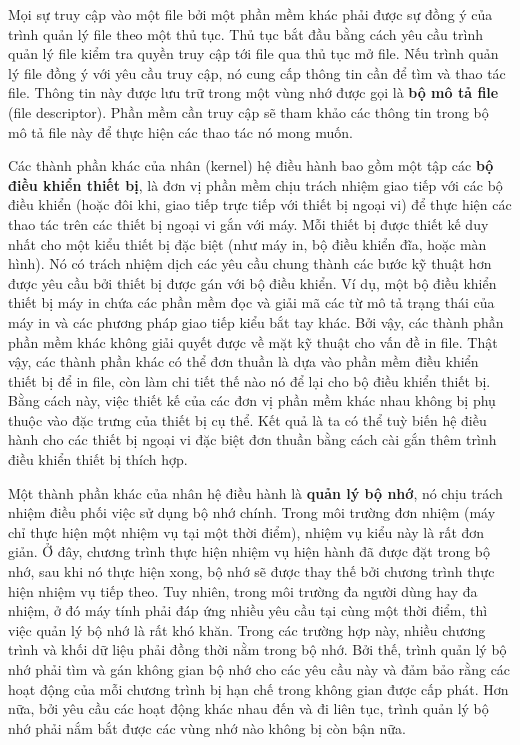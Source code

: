 Mọi sự truy cập vào một file bởi một phần mềm khác phải được sự đồng ý của trình quản lý
file theo một thủ tục. Thủ tục bắt đầu bằng cách yêu cầu trình quản lý file kiểm tra quyền
truy cập tới file qua thủ tục mở file. Nếu trình quản lý file đồng ý với yêu cầu truy cập,
nó cung cấp thông tin cần để tìm và thao tác file. Thông tin này được lưu trữ trong một
vùng nhớ được gọi là \textbf{bộ mô tả file} (file descriptor). Phần mềm cần truy cập sẽ
tham khảo các thông tin trong bộ mô tả file này để thực hiện các thao tác nó mong muốn.

Các thành phần khác của nhân (kernel) hệ điều hành bao gồm một tập các \textbf{bộ điều
  khiển thiết bị}, là đơn vị phần mềm chịu trách nhiệm giao tiếp với các bộ điều khiển
(hoặc đôi khi, giao tiếp trực tiếp với thiết bị ngoại vi) để thực hiện các thao tác trên
các thiết bị ngoại vi gắn với máy. Mỗi thiết bị được thiết kế duy nhất cho một kiểu thiết
bị đặc biệt (như máy in, bộ điều khiển đĩa, hoặc màn hình). Nó có trách nhiệm dịch các yêu
cầu chung thành các bước kỹ thuật hơn được yêu cầu bởi thiết bị được gán với bộ điều
khiển. Ví dụ, một bộ điều khiển thiết bị máy in chứa các phần mềm đọc và giải mã các từ mô
tả trạng thái của máy in và các phương pháp giao tiếp kiểu bắt tay khác. Bởi vậy, các
thành phần phần mềm khác không giải quyết được về mặt kỹ thuật cho vấn đề in file. Thật
vậy, các thành phần khác có thể đơn thuần là dựa vào phần mềm điều khiển thiết bị để in
file, còn làm chi tiết thế nào nó để lại cho bộ điều khiển thiết bị. Bằng cách này, việc
thiết kế của các đơn vị phần mềm khác nhau không bị phụ thuộc vào đặc trưng của thiết bị
cụ thể. Kết quả là ta có thể tuỳ biến hệ điều hành cho các thiết bị ngoại vi đặc biệt đơn
thuần bằng cách cài gắn thêm trình điều khiển thiết bị thích hợp.

Một thành phần khác của nhân hệ điều hành là \textbf{quản lý bộ nhớ}, nó chịu trách nhiệm
điều phối việc sử dụng bộ nhớ chính. Trong môi trường đơn nhiệm (máy chỉ thực hiện một
nhiệm vụ tại một thời điểm), nhiệm vụ kiểu này là rất đơn giản. Ở đây, chương trình thực
hiện nhiệm vụ hiện hành đã được đặt trong bộ nhớ, sau khi nó thực hiện xong, bộ nhớ sẽ
được thay thế bởi chương trình thực hiện nhiệm vụ tiếp theo. Tuy nhiên, trong môi trường
đa người dùng hay đa nhiệm, ở đó máy tính phải đáp ứng nhiều yêu cầu tại cùng một thời
điểm, thì việc quản lý bộ nhớ là rất khó khăn. Trong các trường hợp này, nhiều chương
trình và khối dữ liệu phải đồng thời nằm trong bộ nhớ. Bởi thế, trình quản lý bộ nhớ phải
tìm và gán không gian bộ nhớ cho các yêu cầu này và đảm bảo rằng các hoạt động của mỗi
chương trình bị hạn chế trong không gian được cấp phát. Hơn nữa, bởi yêu cầu các hoạt động
khác nhau đến và đi liên tục, trình quản lý bộ nhớ phải nắm bắt được các vùng nhớ nào
không bị còn bận nữa.

